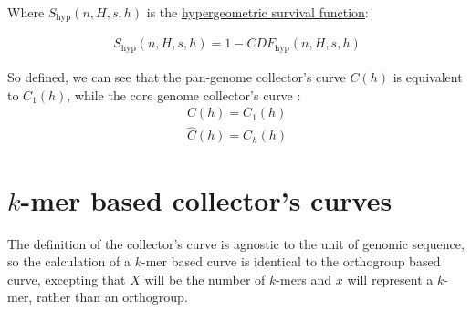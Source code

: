 \documentclass[12pt]{scrartcl}
\begin{document}
Where $S_\text{hyp}(n, H, s, h)$ is the \href{https://docs.scipy.org/doc/scipy/reference/generated/scipy.stats.hypergeom.html}{hypergeometric survival function}:

\begin{align}
    S_\text{hyp}(n, H, s, h) = 1 - CDF_\text{hyp}(n, H, s, h)
\end{align}

So defined, we can see that the pan-genome collector's curve $C(h)$ is equivalent to $C_1(h)$, while the core genome collector's curve :
\begin{align}
    C(h) = C_1(h) \\
    \hat{C}(h) = C_h(h)
\end{align}

\section*{$k$-mer based collector's curves}

The definition of the collector's curve is agnostic to the unit of genomic sequence, so the calculation of a $k$-mer based curve is identical to the orthogroup based curve, excepting that $X$ will be the number of $k$-mers and $x$ will represent a $k$-mer, rather than an orthogroup.
\end{document}
